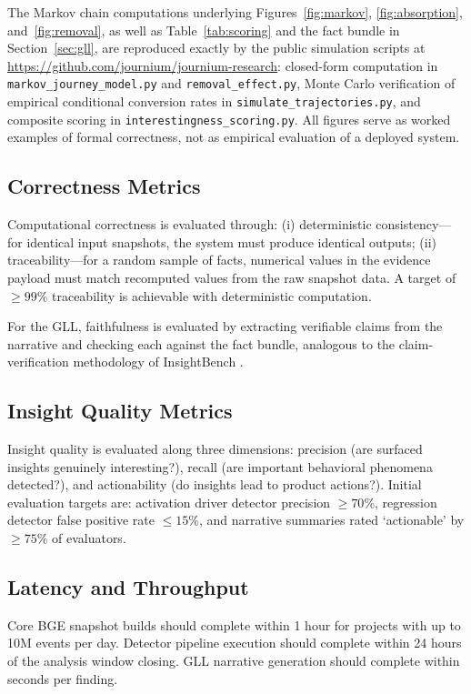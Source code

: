 \documentclass[12pt, a4paper]{article}
\begin{document}
The Markov chain computations underlying Figures~\ref{fig:markov}, \ref{fig:absorption}, and~\ref{fig:removal}, as well as Table~\ref{tab:scoring} and the fact bundle in Section~\ref{sec:gll}, are reproduced exactly by the public simulation scripts at \url{https://github.com/journium/journium-research}: closed-form computation in \texttt{markov\_journey\_model.py} and \texttt{removal\_effect.py}, Monte Carlo verification of empirical conditional conversion rates in \texttt{simulate\_trajectories.py}, and composite scoring in \texttt{interestingness\_scoring.py}. All figures serve as worked examples of formal correctness, not as empirical evaluation of a deployed system.

\subsection{Correctness Metrics}

Computational correctness is evaluated through: (i) deterministic consistency---for identical input snapshots, the system must produce identical outputs; (ii) traceability---for a random sample of facts, numerical values in the evidence payload must match recomputed values from the raw snapshot data. A target of $\geq\!99\%$ traceability is achievable with deterministic computation.

For the GLL, faithfulness is evaluated by extracting verifiable claims from the narrative and checking each against the fact bundle, analogous to the claim-verification methodology of InsightBench \cite{sahu2024}.

\subsection{Insight Quality Metrics}

Insight quality is evaluated along three dimensions: precision (are surfaced insights genuinely interesting?), recall (are important behavioral phenomena detected?), and actionability (do insights lead to product actions?). Initial evaluation targets are: activation driver detector precision $\geq 70\%$, regression detector false positive rate $\leq 15\%$, and narrative summaries rated `actionable' by $\geq 75\%$ of evaluators.

\subsection{Latency and Throughput}

Core BGE snapshot builds should complete within 1 hour for projects with up to 10M events per day. Detector pipeline execution should complete within 24 hours of the analysis window closing. GLL narrative generation should complete within seconds per finding.
\end{document}
